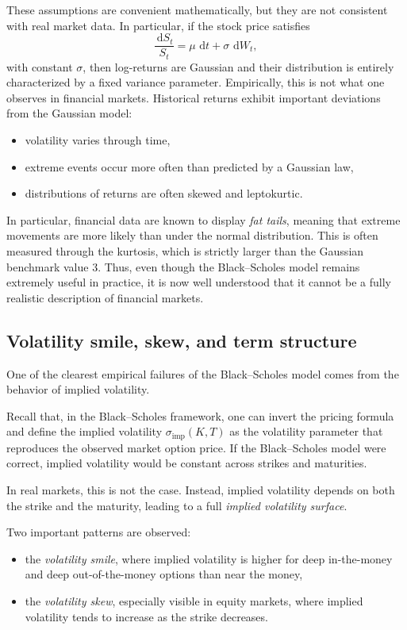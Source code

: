 \documentclass[11pt]{article}
\newcommand{\dd}{\,\mathrm{d}}
\theoremstyle{plain}
\theoremstyle{definition}
\theoremstyle{remark}
\begin{document}
These assumptions are convenient mathematically, but they are not
consistent with real market data.
In particular, if the stock price satisfies
\[
\frac{\dd S_t}{S_t}=\mu\,\dd t+\sigma\,\dd W_t,
\]
with constant \(\sigma\), then log-returns are Gaussian and their
distribution is entirely characterized by a fixed variance parameter.  
Empirically, this is not what one observes in financial markets.
Historical returns exhibit important deviations from the Gaussian model:
\begin{itemize}[leftmargin=1.4em]
    \item volatility varies through time,
    \item extreme events occur more often than predicted by a Gaussian law,
    \item distributions of returns are often skewed and leptokurtic.
\end{itemize}

In particular, financial data are known to display \emph{fat tails},
meaning that extreme movements are more likely than under the normal
distribution.
This is often measured through the kurtosis, which is strictly larger
than the Gaussian benchmark value \(3\). 
Thus, even though the Black--Scholes model remains extremely useful in
practice, it is now well understood that it cannot be a fully realistic
description of financial markets. 

\subsection{Volatility smile, skew, and term structure}

One of the clearest empirical failures of the Black--Scholes model comes
from the behavior of implied volatility.

Recall that, in the Black--Scholes framework, one can invert the pricing
formula and define the implied volatility \(\sigma_{\mathrm{imp}}(K,T)\)
as the volatility parameter that reproduces the observed market option
price.
If the Black--Scholes model were correct, implied volatility would be
constant across strikes and maturities.  

In real markets, this is not the case.
Instead, implied volatility depends on both the strike and the maturity,
leading to a full \emph{implied volatility surface}.  

Two important patterns are observed:
\begin{itemize}[leftmargin=1.4em]
    \item the \emph{volatility smile}, where implied volatility is higher
    for deep in-the-money and deep out-of-the-money options than near the
    money,
    \item the \emph{volatility skew}, especially visible in equity markets,
    where implied volatility tends to increase as the strike decreases.  
\end{itemize}
\end{document}
